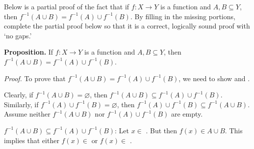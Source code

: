 \documentclass[11pt,letterpaper]{article}
\newcommand{\blank}[1]{\underline{\hspace{#1}}} %
\begin{document}
%	
%	
%	
%	
%
%	
%	



\newpage
 Below is a partial proof of the fact that if $f: X \to Y$ is a function and $A, B \subseteq Y$, then $f^{-1}(A \cup B)= f^{-1}(A) \cup f^{-1}(B)$. By filling in the missing portions, complete the partial proof below so that it is a correct, logically sound proof with `no gaps.' \pspace

\noindent \textbf{Proposition.} If $f: X \to Y$ is a function and $A, B \subseteq Y$, then $f^{-1}(A \cup B)= f^{-1}(A) \cup f^{-1}(B)$. \pspace

\textit{Proof.} To prove that $f^{-1}(A \cup B)= f^{-1}(A) \cup f^{-1}(B)$, we need to show \blank{5cm} \pspace and \blank{5cm}. 


Clearly, if $f^{-1}(A \cup B)= \varnothing$, then $f^{-1}(A \cup B) \subseteq f^{-1}(A) \cup f^{-1}(B)$. Similarly, if $f^{-1}(A) \cup f^{-1}(B)= \varnothing$, then $f^{-1}(A) \cup f^{-1}(B) \subseteq f^{-1}(A \cup B)$. Assume neither $f^{-1}(A \cup B)$ nor $f^{-1}(A) \cup f^{-1}(B)$ are empty. 


$f^{-1}(A \cup B) \subseteq f^{-1}(A) \cup f^{-1}(B)$: Let $x \in$ \blank{3cm}. But then $f(x) \in A \cup B$. This implies \pspace that either $f(x) \in$ \blank{3cm} or $f(x) \in$ \blank{3cm}. \pspace
\end{document}

